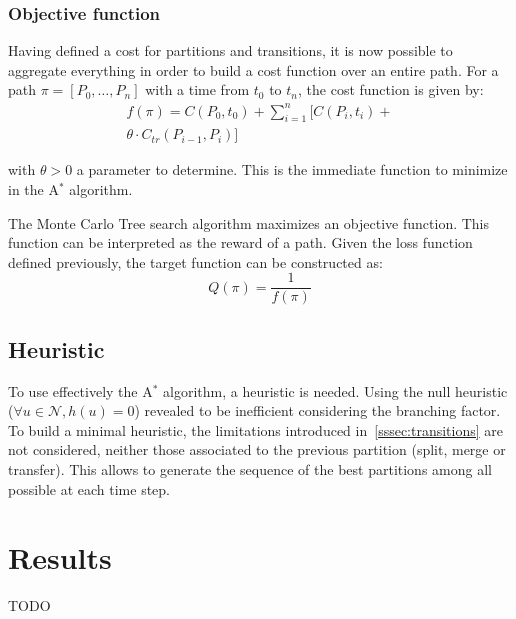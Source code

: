 \documentclass[oneside,twocolumn]{article}
\begin{document}
\subsubsection{Objective function}

Having defined a cost for partitions and transitions, it is now possible to
aggregate everything in order to build a cost function over an entire
path. For a path $\pi = [P_0, \dots, P_n]$ with a time from $t_0$ to $t_n$,
the cost function is given by:
\begin{equation}
  \begin{split}
    f(\pi) = C(P_0, t_0) + \sum_{i = 1}^{n} [C(P_i, t_i) +\\
    \theta \cdot C_{tr}(P_{i-1}, P_i)]
  \end{split}
\end{equation}

with $\theta > 0$ a parameter to determine.
This is the immediate function to minimize in the A$^*$ algorithm.

The Monte Carlo Tree search algorithm maximizes an objective function. This function
can be interpreted as the reward of a path.
Given the loss function defined previously, the target function can be
constructed as:
\begin{equation}
  Q(\pi) = \frac{1}{f(\pi)}
\end{equation}


\subsection{Heuristic}
To use effectively the A\(^*\) algorithm, a heuristic is needed. Using the null
heuristic (\(\forall u \in \mathcal{N}, h(u) = 0\)) revealed to be inefficient
considering the branching factor. To build a minimal heuristic, the limitations
introduced in~\ref{sssec:transitions} are not considered, neither those associated
to the previous partition (split, merge or transfer). This allows to generate
the sequence of the best partitions among all possible at each time step.

\section{Results}

TODO



\end{document}
